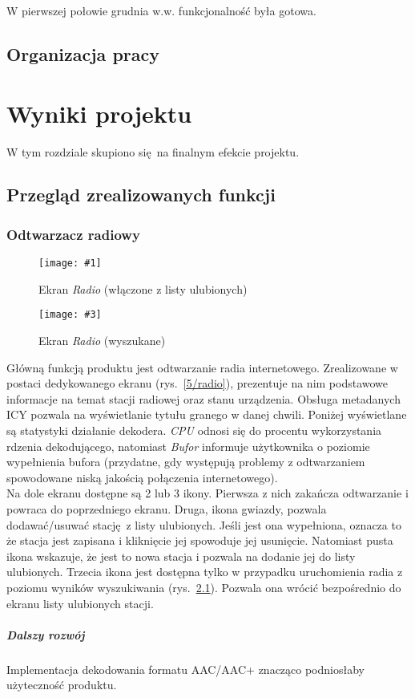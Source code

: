 \documentclass[12pt]{report}
\newcommand{\imgintss}[5]{
	\begin{figure}[{#5}]
		\centering
		\begin{minipage}{.45\textwidth}
			\centering
			\texttt{[image: \#1]}
			\caption{#2}
			\label{#1}
		\end{minipage}%
		\hfill
		\begin{minipage}{.45\textwidth}
			\centering
			\texttt{[image: \#3]}
			\caption{#4}
			\label{#3}
		\end{minipage}
	\end{figure}
}
\newcommand{\imghss}[4]{\imgintss{#1}{#2}{#3}{#4}{H}}
\begin{document}
			 W pierwszej połowie grudnia w.w. funkcjonalność była gotowa.
			 
	 \section{Organizacja pracy}
	 	
\chapter{Wyniki projektu}
	W tym rozdziale skupiono się na finalnym efekcie projektu.
	
	\section{Przegląd zrealizowanych funkcji}
	
		\subsection{Odtwarzacz radiowy}
			\imghss{5/radio}{Ekran \textit{Radio} (włączone z listy ulubionych)}{5/radio_search}{Ekran \textit{Radio} (wyszukane)}
			
			Główną funkcją produktu jest odtwarzanie radia internetowego. Zrealizowane w postaci dedykowanego ekranu (rys.~\ref{5/radio}), prezentuje na nim podstawowe informacje na temat stacji radiowej oraz stanu urządzenia. Obsługa metadanych ICY pozwala na wyświetlanie tytułu granego w danej chwili. Poniżej wyświetlane są statystyki działanie dekodera. \textit{CPU} odnosi się do procentu wykorzystania rdzenia dekodującego, natomiast \textit{Bufor} informuje użytkownika o poziomie wypełnienia bufora (przydatne, gdy występują problemy z odtwarzaniem spowodowane niską jakością połączenia internetowego).
			$ $\\
			
			Na dole ekranu dostępne są 2 lub 3 ikony. Pierwsza z nich zakańcza odtwarzanie i powraca do poprzedniego ekranu. Druga, ikona gwiazdy, pozwala dodawać/usuwać stację z listy ulubionych. Jeśli jest ona wypełniona, oznacza to że stacja jest zapisana i kliknięcie jej spowoduje jej usunięcie. Natomiast pusta ikona wskazuje, że jest to nowa stacja i pozwala na dodanie jej do listy ulubionych. Trzecia ikona jest dostępna tylko w przypadku uruchomienia radia z poziomu wyników wyszukiwania (rys.~\ref{5/radio_search}). Pozwala ona wrócić bezpośrednio do ekranu listy ulubionych stacji.
		
			\paragraph{Dalszy rozwój}
				Implementacja dekodowania formatu AAC/AAC+ znacząco podniosłaby użyteczność produktu.
			
\end{document}
